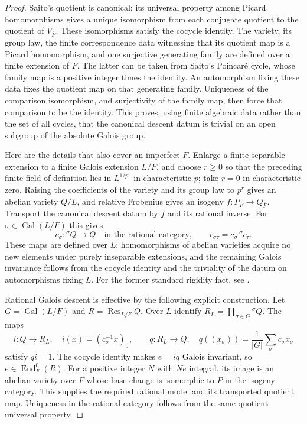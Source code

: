 \begin{proof}
Saito's quotient is canonical: its universal property among Picard
homomorphisms gives a unique isomorphism from each conjugate quotient
to the quotient of $V_{\overline F}$.  These isomorphisms satisfy the
cocycle identity.  The variety, its group law, the finite correspondence
data witnessing that its quotient map is a Picard homomorphism, and
one surjective generating family are defined over a finite extension
of $F$.  The latter can be taken from Saito's Poincar\'e cycle, whose
family map is a positive integer times the identity.  An automorphism
fixing these data fixes the quotient map on that generating family.
Uniqueness of the comparison isomorphism, and surjectivity of the
family map, then force that comparison to be the identity.  This
proves, using finite algebraic data rather than the set of all cycles,
that the canonical descent datum is trivial on an open subgroup of
the absolute Galois group.

Here are the details that also cover an imperfect $F$.  Enlarge a
finite separable extension to a finite Galois extension $L/F$, and
choose $r\ge0$ so that the preceding finite field of definition lies
in $L^{1/p^r}$ in characteristic $p$; take $r=0$ in characteristic
zero.  Raising the coefficients of the variety and its group law to
$p^r$ gives an abelian variety $Q/L$, and relative Frobenius gives an
isogeny $f:P_{\overline F}\to Q_{\overline F}$.
Transport the canonical descent datum by $f$ and its rational inverse.
For $\sigma\in\operatorname{Gal}(L/F)$ this gives
\[
 c_\sigma:{}^\sigma Q\longrightarrow Q
 \quad\text{in the rational category},\qquad
 c_{\sigma\tau}=c_\sigma\,{}^\sigma c_\tau.
\]
These maps are defined over $L$: homomorphisms of abelian varieties
acquire no new elements under purely inseparable extensions, and the
remaining Galois invariance follows from the cocycle identity and the
triviality of the datum on automorphisms fixing $L$.  For the former
standard rigidity fact, see \cite[Example~4.2.14, p.~38]{ConradAV}.

Rational Galois descent is effective by the following explicit
construction.  Let $G=\operatorname{Gal}(L/F)$ and
$R=\operatorname{Res}_{L/F}Q$.  Over $L$ identify
$R_L=\prod_{\sigma\in G}{}^\sigma Q$.  The maps
\[
 i:Q\longrightarrow R_L,\quad
 i(x)=(c_\sigma^{-1}x)_\sigma,
 \qquad
 q:R_L\longrightarrow Q,\quad
 q((x_\sigma))=\frac1{|G|}\sum_\sigma c_\sigma x_\sigma
\]
satisfy $qi=1$.  The cocycle identity makes $e=iq$ Galois invariant,
so $e\in\operatorname{End}^0_F(R)$.  For a positive integer $N$ with
$Ne$ integral, its image is an abelian variety over $F$ whose base
change is isomorphic to $P$ in the isogeny category.  This supplies the
required rational model and its transported quotient map.  Uniqueness
in the rational category follows from the same quotient universal
property.


\end{proof}
